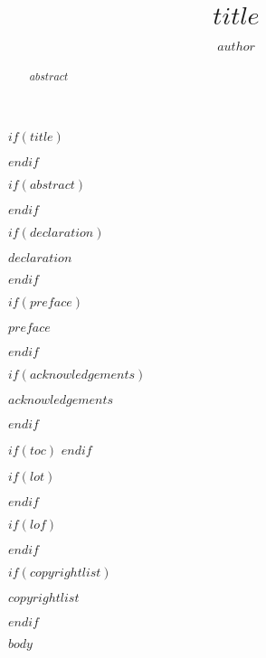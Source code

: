 \documentclass[12pt,twoside]{style/hdlbrgthesis}
\title{$title$}
\author{$author$}
\begin{document}
\begin{frontmatter}
$if(title)$
  \maketitle
$endif$

$if(abstract)$
  \begin{abstract}
    $abstract$
  \end{abstract}
$endif$

$if(declaration)$
  \begin{declaration}
    $declaration$
  \end{declaration}
$endif$

$if(preface)$
  \begin{preface}
    $preface$
  \end{preface}
$endif$

$if(acknowledgements)$
  \begin{acknowledgements}
    $acknowledgements$
  \end{acknowledgements}
$endif$

$if(toc)$
  \hypersetup{linkcolor=$if(toccolor)$$toccolor$$else$black$endif$}
  \setcounter{tocdepth}{$toc-depth$}
  \tableofcontents
$endif$

$if(lot)$
  \listoftables
$endif$

$if(lof)$
  \listoffigures
$endif$

$if(copyrightlist)$
\begin{copyrightlist}
  $copyrightlist$
\end{copyrightlist}
$endif$

\end{frontmatter}

%

\begin{mainmatter}

$body$

\end{mainmatter}
\end{document}
